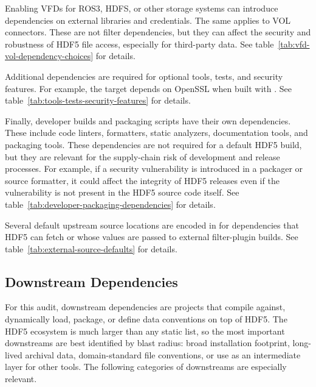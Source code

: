 \documentclass[../main.tex]{subfiles}
\begin{document}
Enabling VFDs for ROS3, HDFS, or other storage systems can introduce dependencies on
external libraries and credentials. The same applies to VOL connectors.
These are not filter dependencies, but they can affect the security and
robustness of HDF5 file access, especially for third-party data.
See table~\ref{tab:vfd-vol-dependency-choices} for details.

Additional dependencies are required for optional tools, tests, and
security features. For example, the  target depends on
OpenSSL when built with .
See table~\ref{tab:tools-tests-security-features} for details.

Finally, developer builds and packaging scripts have their own dependencies. These include code linters, formatters,
static analyzers, documentation tools, and packaging tools. These dependencies  
are not required for a default HDF5 build, but they are relevant for
the supply-chain risk of development and release processes.
For example, if a security vulnerability is introduced in a packager or
source formatter, it could affect the integrity of HDF5 releases
even if the vulnerability is not present in the HDF5 source code itself.
See table~\ref{tab:developer-packaging-dependencies} for details.

Several default upstream source locations are encoded in
 for dependencies that HDF5 can fetch or whose
values are passed to external filter-plugin builds.
See table~\ref{tab:external-source-defaults} for details.

\subsection{Downstream Dependencies}

For this audit, downstream dependencies are projects that compile against,
dynamically load, package, or define data conventions on top of HDF5. The HDF5
ecosystem is much larger than any static list, so the most important downstreams
are best identified by blast radius: broad installation footprint, long-lived
archival data, domain-standard file conventions, or use as an intermediate layer
for other tools. The following categories of downstreams are especially
relevant.
\end{document}
